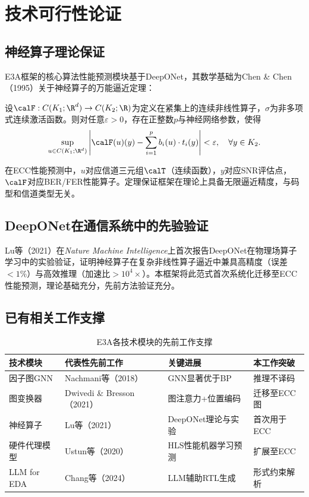 ﻿\section{技术可行性论证}\label{sec:feasibility}

\subsection{神经算子理论保证}

E3A框架的核心算法性能预测模块基于DeepONet，其数学基础为Chen \& Chen（1995）关于神经算子的万能逼近定理\cite{chen1995}：

\begin{tcolorbox}[hypothesisstyle,title={定理：神经算子万能逼近性（Chen \& Chen, 1995）}]
设$\calF: C(K_1;\R^d) \to C(K_2;\R)$为定义在紧集上的连续非线性算子，$\sigma$为非多项式连续激活函数。则对任意$\varepsilon > 0$，存在正整数$p$与神经网络参数，使得
$$
\sup_{u \in C(K_1;\R^d)} \left|\calF(u)(y) - \sum_{i=1}^{p} b_i(u) \cdot t_i(y)\right| < \varepsilon, \quad \forall y \in K_2.
$$
\end{tcolorbox}

在ECC性能预测中，$u$对应信道三元组$\calT$（连续函数），$y$对应SNR评估点，$\calF$对应BER/FER性能算子。定理保证框架在理论上具备无限逼近精度，与码型和信道类型无关。

\subsection{DeepONet在通信系统中的先验验证}

Lu等（2021）\cite{lu2021}在\textit{Nature Machine Intelligence}上首次报告DeepONet在物理场算子学习中的实验验证，证明神经算子在复杂非线性算子逼近中兼具高精度（误差$<1\%$）与高效推理（加速比$>10^4\times$）。本框架将此范式首次系统化迁移至ECC性能预测，理论基础充分，先前方法验证充分。

\subsection{已有相关工作支撑}

\begin{table}[htbp]
\centering
\caption{E3A各技术模块的先前工作支撑}
\label{tab:prior_work}
\setlength{\tabcolsep}{4pt}
\begin{tabular}{@{}L{2.5cm}L{4.5cm}L{4.5cm}L{2.0cm}@{}}
\toprule
\textbf{技术模块} & \textbf{代表性先前工作} & \textbf{关键进展} & \textbf{本工作突破} \\
\midrule
因子图GNN & Nachmani等（2018）\cite{nachmani2018} & GNN显著优于BP & 推理不译码 \\
图变换器 & Dwivedi \& Bresson（2021）\cite{dwivedi2021} & 图注意力+位置编码 & 迁移至ECC图 \\
神经算子 & Lu等（2021）\cite{lu2021} & DeepONet理论与实验 & 首次用于ECC \\
硬件代理模型 & Ustun等（2020）\cite{ustun2020} & HLS性能机器学习预测 & 扩展至ECC \\
LLM for EDA & Chang等（2024）\cite{chang2024} & LLM辅助RTL生成 & 形式约束解析 \\
\bottomrule
\end{tabular}
\end{table}

